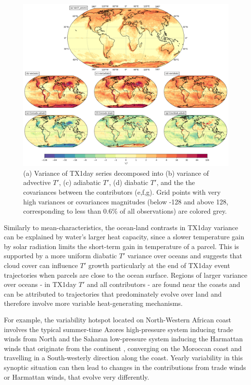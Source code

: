 \documentclass[11pt,a4paper,twoside,openright]{report}
\theoremstyle{definition}
\begin{document}
\begin{figure}[h]
\includegraphics[width=1\linewidth]{images/vardecomp} \caption{(a) Variance of TX1day series decomposed into (b) variance of advective $T'$, (c) adiabatic $T'$, (d) diabatic $T'$, and the the covariances between the contributors (e,f,g). Grid points with very high variances or covariances magnitudes (below -128 and above 128, corresponding to less than 0.6\% of all observations) are colored grey.}\label{fig:vardecomp}
\end{figure}

Similarly to mean-characteristics, the ocean-land contrasts in TX1day variance can be explained by water's larger heat capacity, since a slower temperature gain by solar radiation limits the short-term gain in temperature of a parcel. This is supported by a more uniform diabatic \(T'\) variance over oceans and suggests that cloud cover can influence \(T'\) growth particularly at the end of TX1day event trajectories when parcels are close to the ocean surface. Regions of larger variance over oceans - in TX1day \(T'\) and all contributors - are found near the coasts and can be attributed to trajectories that predominately evolve over land and therefore involve more variable heat-generating mechanisms.

For example, the variability hotspot located on North-Western African coast involves the typical summer-time Azores high-pressure system inducing trade winds from North and the Saharan low-pressure system inducing the Harmattan winds that originate from the continent \citep{adame_saharan_2022}, converging on the Moroccan coast and travelling in a South-westerly direction along the coast. Yearly variability in this synoptic situation can then lead to changes in the contributions from trade winds or Harmattan winds, that evolve very differently.
\end{document}
